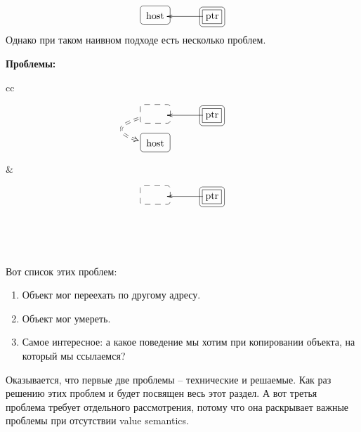 \[
\xymatrix@R=15pt@C=15pt{
  {\text{host}}
  	{
	\save
   [].[]*+[F-:<3pt>]\frm{}
   \restore
	}
  &{}&{\text{ptr}}\ar[ll]
    	{
	\save
   [].[]*[F-]\frm{}
   \restore
	}
    	{
	\save
   [].[]*+[F-:<3pt>]\frm{}
   \restore
	}
  \\ 
}
\]
Однако при таком наивном подходе есть несколько проблем.
\begin{center}
\textbf{Проблемы:}

\vspace{0.5cm}

\begin{tabular}{cc}
{
\begin{minipage}[\baselineskip]{5.5cm}
\[
\xymatrix@R=15pt@C=15pt{
  {\phantom{host}}\ar@{==>}@/_30pt/[d]<-5pt>
  	{
	\save
   [].[]*+[F--:<3pt>]\frm{}
   \restore
	}
  &{}&{\text{ptr}}\ar[ll]
    	{
	\save
   [].[]*[F-]\frm{}
   \restore
	}
    	{
	\save
   [].[]*+[F-:<3pt>]\frm{}
   \restore
	}
  \\ 
  {\text{host}}
    	{
	\save
   [].[]*+[F-:<3pt>]\frm{}
   \restore
	}
  &{}&{}\\
}
\]
\end{minipage}
}&{
\begin{minipage}[\baselineskip]{5.5cm}
\[
\xymatrix@R=15pt@C=15pt{
  {\phantom{host}}
  	{
	\save
   [].[]*+[F--:<3pt>]\frm{}
   \restore
	}
  &{}&{\text{ptr}}\ar[ll]
    	{
	\save
   [].[]*[F-]\frm{}
   \restore
	}
    	{
	\save
   [].[]*+[F-:<3pt>]\frm{}
   \restore
	}
  \\ 
  {\phantom{host}}
  &{}&{}\\
}
\]
\end{minipage}
}\\
\end{tabular}
\end{center}
Вот список этих проблем:
\begin{enumerate}
\item Объект мог переехать по другому адресу.

\item Объект мог умереть.

\item Самое интересное: а какое поведение мы хотим при копировании объекта, на который мы ссылаемся?
\end{enumerate}
Оказывается, что первые две проблемы -- технические и решаемые.
Как раз решению этих проблем и будет посвящен весь этот раздел.
А вот третья проблема требует отдельного рассмотрения, потому что она раскрывает важные проблемы при отсутствии value semantics.

